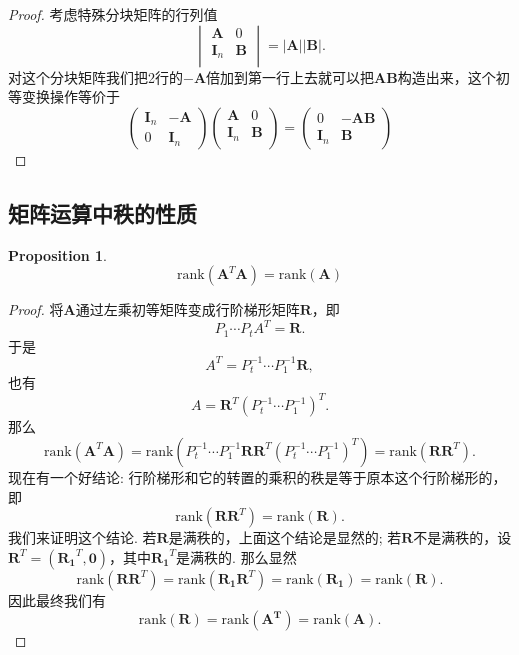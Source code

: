 \documentclass{article}
\newtheorem{proposition}[theorem]{Proposition}
\newcommand{\mbf}[1]{\bm{#1}}
\newcommand{\rank}[1]{\text{rank}\left(#1\right)} %
\begin{document}
\begin{proof}
考虑特殊分块矩阵的行列值
$$
\begin{vmatrix}
\mbf{A} & 0 \\
\mbf{I}_n & \mbf{B} \\
\end{vmatrix} = |\mbf{A}||\mbf{B}|.
$$
对这个分块矩阵我们把2行的$-\mbf{A}$倍加到第一行上去就可以把$\mbf{A}\mbf{B}$构造出来，这个初等变换操作等价于
$$
\begin{pmatrix}
\mbf{I}_n & -\mbf{A} \\
0 & \mbf{I}_n
\end{pmatrix}
\begin{pmatrix}
\mbf{A} & 0 \\
\mbf{I}_n & \mbf{B} \\
\end{pmatrix} = 
\begin{pmatrix}
0 & -\mbf{A}\mbf{B} \\
\mbf{I}_n & \mbf{B} 
\end{pmatrix}
$$
\end{proof}

\newpage
\subsection{矩阵运算中秩的性质}

\begin{proposition}\label{rank-of-matrix-multiplication: transpose}
\rm 
$$
\rank{\mbf{A}^T\mbf{A}} = \rank{\mbf{A}}
$$
\end{proposition}

\begin{proof}
将$\mbf{A}$通过左乘初等矩阵变成行阶梯形矩阵$\mbf{R}$，即
$$
P_1\cdots P_t A^T = \mbf{R}.
$$
于是
$$
A^T = P_t^{-1}\cdots P_1^{-1}\mbf{R},
$$
也有
$$
A = \mbf{R}^T(P_t^{-1}\cdots P_1^{-1})^T.
$$
那么
$$
\rank{\mbf{A}^T\mbf{A}} = \rank{P_t^{-1}\cdots P_1^{-1}\mbf{R}\mbf{R}^T(P_t^{-1}\cdots P_1^{-1})^T} = \rank{\mbf{R}\mbf{R}^T}. 
$$
现在有一个好结论: 行阶梯形和它的转置的乘积的秩是等于原本这个行阶梯形的，即
$$
\rank{\mbf{R}\mbf{R}^T} = \rank{\mbf{R}}.
$$
我们来证明这个结论. 若$\mbf{R}$是满秩的，上面这个结论是显然的; 若$\mbf{R}$不是满秩的，设$\mbf{R}^T = (\mbf{R_1}^T, \mbf{0})$，其中$\mbf{R_1}^T$是满秩的. 那么显然
$$
\rank{\mbf{R}\mbf{R}^T} = \rank{\mbf{R_1}\mbf{R}^T} = \rank{\mbf{R_1}} = \rank{\mbf{R}}.
$$
因此最终我们有
$$
\rank{\mbf{R}} = \rank{\mbf{A^T}} = \rank{\mbf{A}}.
$$
\end{proof}
\end{document}
